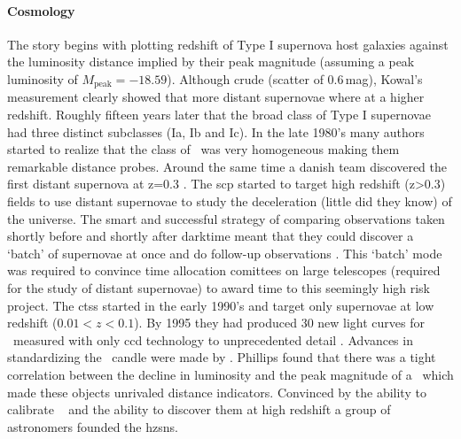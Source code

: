 \paragraph{ Cosmology}
The story begins with \citet{1968AJ.....73.1021K} plotting redshift of Type I supernova host galaxies against the luminosity distance implied by their peak magnitude (assuming a peak luminosity of $M_\textrm{peak}=-18.59$). Although crude (scatter of 0.6\,mag), Kowal's measurement clearly showed that more distant supernovae where at a higher redshift. Roughly fifteen years later that the broad class of Type I supernovae had three distinct subclasses (Ia, Ib and Ic). In the late 1980's many authors started to realize that the class of \sneia\ was very homogeneous \citep[][and references therein]{1992ARA&A..30..359B} making them remarkable  distance probes. Around the same time a danish team discovered the first distant supernova at z=0.3 \citep{1989Natur.339..523N}. The \gls{scp} started to target high redshift (z>0.3) fields to use distant supernovae to study the deceleration (little did they know) of the universe. The smart and successful strategy of comparing observations taken shortly before and shortly after darktime meant that they could discover a `batch' of supernovae at once and do follow-up observations  \citep{1995STIN...9629501P}. This `batch' mode was required to convince time allocation comittees on large telescopes (required for the study of distant supernovae) to award time to this seemingly high risk project. The \gls{ctss} started in the early 1990's and target only supernovae at low redshift ($0.01 < z < 0.1$). By 1995 they had produced 30 new light curves for \sneia\ measured with only \gls{ccd} technology to unprecedented detail \citep{1995AJ....109....1H}. Advances in standardizing the \snia\ candle were made by \citet{1993ApJ...413L.105P}. Phillips found that there was a tight correlation between the decline in luminosity and the peak magnitude of a \snia\ which made these objects unrivaled distance indicators. Convinced by the ability to calibrate \sneia\ \citep{1993ApJ...413L.105P} and the ability to discover them at high redshift  \citep{1995STIN...9629501P} a group of astronomers founded the \gls{hzsns}. 
